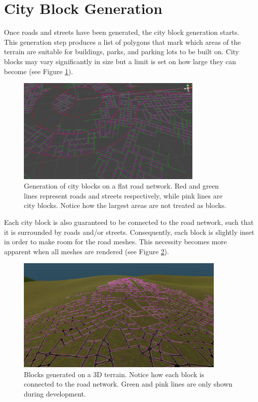 \section{City Block Generation}

Once roads and streets have been generated, the city block generation starts.
This generation step produces a list of polygons that mark which areas of the terrain are suitable for buildings, parks, and parking lots to be built on.
City blocks may vary significantly in size but a limit is set on how large they can become (see Figure \ref{fig:results_blockgen1}).

\begin{figure}[h!]
  \centering

  \includegraphics[width=0.8\textwidth]{figure/results_blockgen1.png}
  \caption{Generation of city blocks on a flat road network. Red and green lines represent roads and streets respectively, while pink lines are city blocks. Notice how the largest areas are not treated as blocks.}

  \label{fig:results_blockgen1}
\end{figure}

Each city block is also guaranteed to be connected to the road network, such that it is surrounded by roads and/or streets.
Consequently, each block is slightly inset in order to make room for the road meshes.
This necessity becomes more apparent when all meshes are rendered (see Figure \ref{fig:results_blockgen2}).

\begin{figure}[h!]
  \centering

  \includegraphics[width=0.9\textwidth]{figure/results_blockgen2.png}
  \caption{Blocks generated on a 3D terrain. Notice how each block is connected to the road network. Green and pink lines are only shown during development.}

  \label{fig:results_blockgen2}
\end{figure}

